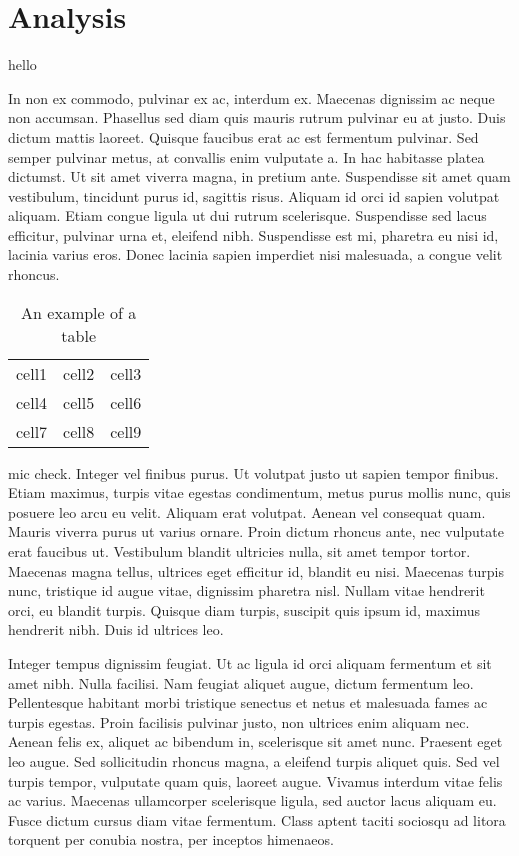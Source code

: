 \chapter{Analysis}

hello

In non ex commodo, pulvinar ex ac, interdum ex. Maecenas dignissim ac neque non accumsan. Phasellus sed diam quis mauris rutrum pulvinar eu at justo. Duis dictum mattis laoreet. Quisque faucibus erat ac est fermentum pulvinar. Sed semper pulvinar metus, at convallis enim vulputate a. In hac habitasse platea dictumst. Ut sit amet viverra magna, in pretium ante. Suspendisse sit amet quam vestibulum, tincidunt purus id, sagittis risus. Aliquam id orci id sapien volutpat aliquam. Etiam congue ligula ut dui rutrum scelerisque. Suspendisse sed lacus efficitur, pulvinar urna et, eleifend nibh. Suspendisse est mi, pharetra eu nisi id, lacinia varius eros. Donec lacinia sapien imperdiet nisi malesuada, a congue velit rhoncus.


\begin{table}[t]
\begin{center}
\begin{tabular}{ c c c } 
 \hline
 cell1 & cell2 & cell3 \\ 
 cell4 & cell5 & cell6 \\ 
 cell7 & cell8 & cell9 \\ 
 \hline
\end{tabular}
\caption[Example Table]{An example of a table}
	\label{example_table} 
\end{center}
\end{table}

mic check. Integer vel finibus purus. Ut volutpat justo ut sapien tempor finibus. Etiam maximus, turpis vitae egestas condimentum, metus purus mollis nunc, quis posuere leo arcu eu velit. Aliquam erat volutpat. Aenean vel consequat quam. Mauris viverra purus ut varius ornare. Proin dictum rhoncus ante, nec vulputate erat faucibus ut. Vestibulum blandit ultricies nulla, sit amet tempor tortor. Maecenas magna tellus, ultrices eget efficitur id, blandit eu nisi. Maecenas turpis nunc, tristique id augue vitae, dignissim pharetra nisl. Nullam vitae hendrerit orci, eu blandit turpis. Quisque diam turpis, suscipit quis ipsum id, maximus hendrerit nibh. Duis id ultrices leo.

Integer tempus dignissim feugiat. Ut ac ligula id orci aliquam fermentum et sit amet nibh. Nulla facilisi. Nam feugiat aliquet augue, dictum fermentum leo. Pellentesque habitant morbi tristique senectus et netus et malesuada fames ac turpis egestas. Proin facilisis pulvinar justo, non ultrices enim aliquam nec. Aenean felis ex, aliquet ac bibendum in, scelerisque sit amet nunc. Praesent eget leo augue. Sed sollicitudin rhoncus magna, a eleifend turpis aliquet quis. Sed vel turpis tempor, vulputate quam quis, laoreet augue. Vivamus interdum vitae felis ac varius. Maecenas ullamcorper scelerisque ligula, sed auctor lacus aliquam eu. Fusce dictum cursus diam vitae fermentum. Class aptent taciti sociosqu ad litora torquent per conubia nostra, per inceptos himenaeos.

